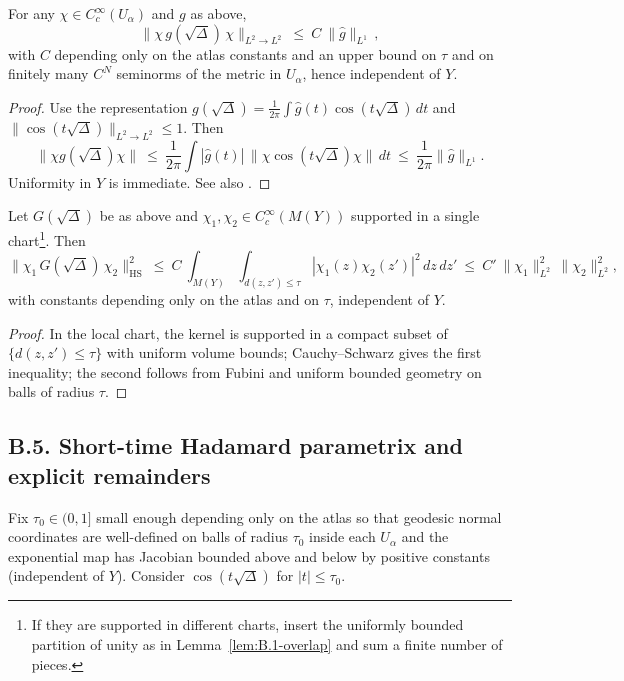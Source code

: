 \begin{proposition}\label{prop:B.4-L2}
For any $\chi\in C_c^\infty(U_\alpha)$ and $g$ as above,
\[
\|\chi\,g(\sqrt\Delta)\,\chi\|_{L^2\to L^2}\ \le\ C\ \|\widehat g\|_{L^1}\,,
\]
with $C$ depending only on the atlas constants and an upper bound on $\tau$ and on finitely
many $C^N$ seminorms of the metric in $U_\alpha$, hence independent of $Y$.
\end{proposition}

\begin{proof}
Use the representation $g(\sqrt\Delta)=\frac{1}{2\pi}\int \widehat g(t)\cos(t\sqrt\Delta)\,dt$ and $\|\cos(t\sqrt\Delta)\|_{L^2\to L^2}\le 1$. Then
\[
\|\chi g(\sqrt\Delta)\chi\|\ \le\ \frac{1}{2\pi}\int |\widehat g(t)|\,\|\chi\cos(t\sqrt\Delta)\chi\|\,dt\ \le\ \frac{1}{2\pi}\|\widehat g\|_{L^1}.
\]
Uniformity in $Y$ is immediate. See also \cite[Prop.~4.1]{Sogge}.
\end{proof}

\begin{lemma}\label{lem:B.4-HS}
Let $G(\sqrt\Delta)$ be as above and $\chi_1,\chi_2\in C_c^\infty(M(Y))$ supported in a single chart\footnote{If they are supported in different charts, insert the uniformly bounded partition of unity as in Lemma~\ref{lem:B.1-overlap} and sum a finite number of pieces.}.
Then
\[
\|\chi_1\,G(\sqrt\Delta)\,\chi_2\|_{\mathrm{HS}}^2
\ \le\ C\ \int_{M(Y)}\int_{d(z,z')\le \tau} |\chi_1(z)\chi_2(z')|^2\,dz\,dz'
\ \le\ C'\ \|\chi_1\|_{L^2}^2\,\|\chi_2\|_{L^2}^2,
\]
with constants depending only on the atlas and on $\tau$, independent of $Y$.
\end{lemma}

\begin{proof}
In the local chart, the kernel is supported in a compact subset of $\{d(z,z')\le \tau\}$ with uniform volume bounds; Cauchy–Schwarz gives the first inequality; the second follows from Fubini and uniform bounded geometry on balls of radius $\tau$.
\end{proof}

\subsection*{B.5. Short-time Hadamard parametrix and explicit remainders}

\noindent
Fix $\tau_0\in(0,1]$ small enough depending only on the atlas so that geodesic normal
coordinates are well-defined on balls of radius $\tau_0$ inside each $U_\alpha$ and
the exponential map has Jacobian bounded above and below by positive constants
(independent of $Y$). Consider $\cos(t\sqrt\Delta)$ for $|t|\le \tau_0$.

